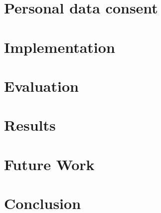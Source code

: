 \documentclass{llncs}
\begin{document}
\section{Personal data consent}
\label{sec:research_question}


\section{Implementation}
\label{sec:implementation}


\section{Evaluation}
\label{sec:evaluation}


\section{Results}
\label{sec:results}


\section{Future Work}

\section{Conclusion}
\label{sec:conclusion}




\end{document}

